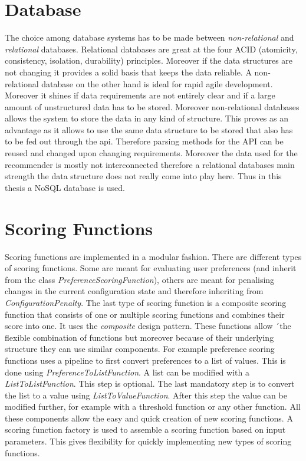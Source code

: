 \section{Database}
\label{sec:DesignImplementation:Database}

The choice among database systems has to be made between \emph{non-relational} and \emph{relational} databases. Relational databases are great at the four ACID (atomicity, consistency, isolation, durability) principles. Moreover if the data structures are not changing it provides a solid basis that keeps the data reliable. A non-relational database on the other hand is ideal for rapid agile development. Moreover it shines if data requirements are not entirely clear and if a large amount of unstructured  data has to be stored. Moreover non-relational databases allows the system to store the data in any kind of structure. This proves as an advantage as it allows to use the same data structure to be stored that also has to be fed out through the api. Therefore parsing methods for the API can be reused and changed upon changing requirements. Moreover the data used for the recommender is mostly not interconnected therefore a relational databases main strength the data structure does not really come into play here. Thus in this thesis a NoSQL database is used. 

\section{Scoring Functions}
\label{sec:DesignImplementation:ScroingFunctions}

Scoring functions are implemented in a modular fashion. There are different types of scoring functions. Some are meant for evaluating user preferences (and inherit from the class \emph{PreferenceScoringFunction}), others are meant for penalising changes in the current configuration state and therefore inheriting from  \emph{ConfigurationPenalty}. The last type of scoring function is a composite scoring function that consists of one or multiple scoring functions and combines their score into one. It uses the \emph{composite} design pattern. These functions allow ´the flexible combination of functions but moreover because of their underlying structure they can use similar components. For example preference scoring functions uses a pipeline to first convert preferences to a list of values. This is done using \emph{PreferenceToListFunction}. A list can be modified with a \emph{ListToListFunction}. This step is optional. The last mandatory step is to convert the list to a value using \emph{ListToValueFunction}. After this step the value can be modified further, for example with a threshold function or any other function. All these components allow the easy and quick creation of new scoring functions. A scoring function factory is used to assemble a scoring function based on input parameters. This gives flexibility for quickly implementing new types of scoring functions.


